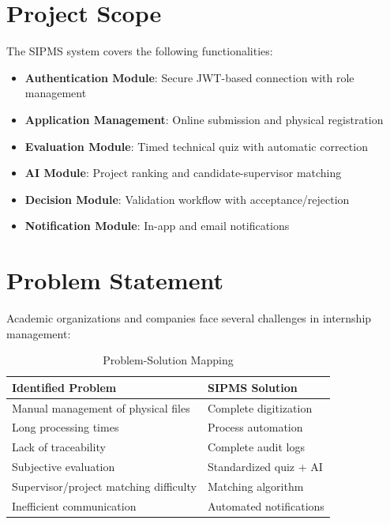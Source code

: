 \documentclass[12pt,a4paper]{report}
\begin{document}
\section{Project Scope}
The SIPMS system covers the following functionalities:

\begin{itemize}
    \item \textbf{Authentication Module}: Secure JWT-based connection with role management
    \item \textbf{Application Management}: Online submission and physical registration
    \item \textbf{Evaluation Module}: Timed technical quiz with automatic correction
    \item \textbf{AI Module}: Project ranking and candidate-supervisor matching
    \item \textbf{Decision Module}: Validation workflow with acceptance/rejection
    \item \textbf{Notification Module}: In-app and email notifications
\end{itemize}

\section{Problem Statement}
Academic organizations and companies face several challenges in internship management:

\begin{table}[H]
\centering
\begin{tabular}{|l|l|}
\hline
\textbf{Identified Problem} & \textbf{SIPMS Solution} \\ \hline
Manual management of physical files & Complete digitization \\ \hline
Long processing times & Process automation \\ \hline
Lack of traceability & Complete audit logs \\ \hline
Subjective evaluation & Standardized quiz + AI \\ \hline
Supervisor/project matching difficulty & Matching algorithm \\ \hline
Inefficient communication & Automated notifications \\ \hline
\end{tabular}
\caption{Problem-Solution Mapping}
\end{table}

\end{document}
